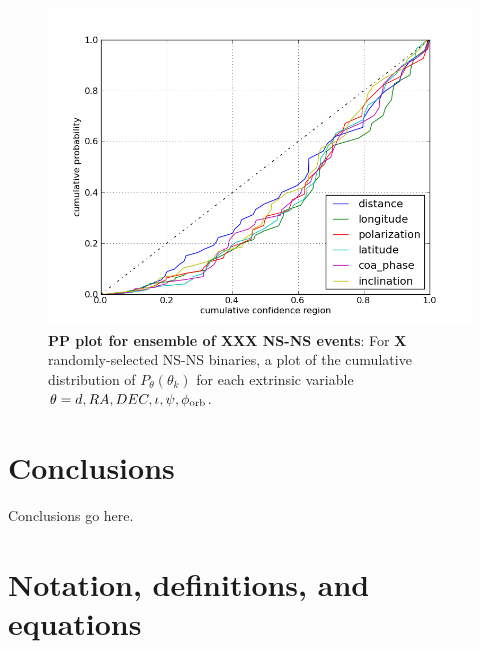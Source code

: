 \documentclass[twocolumn,prd,nofootinbib]{revtex4}
\begin{document}
\begin{figure}
\includegraphics[width=\columnwidth]{../Figures/BNS_2015_MDC_test_pp_plot}
\caption{\textbf{PP plot for ensemble of XXX NS-NS events}: For \textbf{X} randomly-selected NS-NS binaries, a plot of
  the cumulative distribution of $P_\theta(\theta_k)$ for each extrinsic variable $\theta=d,RA,DEC,\iota,\psi,\phi_{\rm orb}$.
}
\end{figure}


\section{Conclusions}

Conclusions go here.

\appendix


\section{Notation, definitions, and equations}
\end{document}
